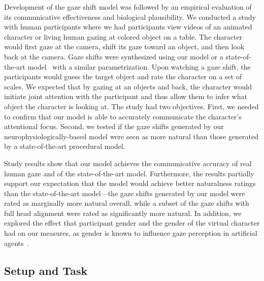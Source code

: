 Development of the gaze shift model was followed by an empirical evaluation of its communicative effectiveness and biological plausibility. We conducted a study with human participants where we had participants view videos of an animated character or living human gazing at colored object on a table. The character would first gaze at the camera, shift its gaze toward an object, and then look back at the camera. Gaze shifts were synthesized using our model or a state-of-the-art model~\citep{peters2010animating} with a similar parametrization. Upon watching a gaze shift, the participants would guess the target object and rate the character on a set of scales. We expected that by gazing at an objects and back, the character would initiate joint attention with the participant and thus allow them to infer what object the character is looking at. The study had two objectives. First, we needed to confirm that our model is able to accurately communicate the character's attentional focus. Second, we tested if the gaze shifts generated by our neurophysiologically-based model were seen as more natural than those generated by a state-of-the-art procedural model.

Study results show that our model achieves the communicative accuracy of real human gaze and of the state-of-the-art model. Furthermore, the results partially support our expectation that the model would achieve better naturalness ratings than the state-of-the-art model---the gaze shifts generated by our model were rated as marginally more natural overall, while a subset of the gaze shifts with full head alignment were rated as significantly more natural. In addition, we explored the effect that participant gender and the gender of the virtual character had on our measures, as gender is known to influence gaze perception in artificial agents~\citep{mutlu2006storytelling}.

\subsection{Setup and Task}


